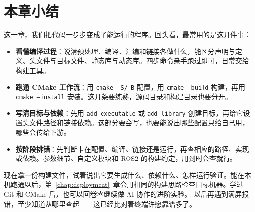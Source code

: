 \documentclass[
  lang=cn,
  scheme=chinese,
  chinesefont=ctexfont,
  11pt,
  oneside,
  device=normal,
  color=cyan,
  mode=fancy
]{../templates/elegantbook}
\begin{document}
\begingroup
\setlength{\emergencystretch}{3em}
\let\subsection\section

\makeatletter
\let\subsection\textbook@subsection
\makeatother

\clearpage
\section{本章小结}
这一章，我们把代码一步步变成了能运行的程序。回头看，最常用的是这几件事：
\begin{itemize}
    \item \textbf{看懂编译过程}：说清预处理、编译、汇编和链接各做什么，能区分声明与定义、头文件与目标文件、静态库与动态库。四步命令亲手跑过即可，日常交给构建工具。
    \item \textbf{跑通 CMake 工作流}：用 \texttt{cmake -S/-B} 配置，用 \texttt{cmake --build} 构建，再用 \texttt{cmake --install} 安装。这几条要练熟，源码目录和构建目录也要分开。
    \item \textbf{写清目标与依赖}：先用 \texttt{add\_executable} 或 \texttt{add\_library} 创建目标，再给它设置头文件路径和链接依赖。这部分要会写，也要能说出哪些配置只给自己用，哪些会传给下游。
    \item \textbf{按阶段排错}：先判断卡在配置、编译、链接还是运行，再查相应的路径、实现或依赖。参数细节、自定义模块和 ROS2 的构建约定，用到时会查就行。
\end{itemize}
现在拿一份构建文件，试着说出它要生成什么、依赖什么、怎样运行验证。能在本机跑通以后，第~\ref{chap:deployment}~章会用相同的构建思路检查目标机器。学过 Git 和 CMake 后，也可以回卷零继续做 AI 协作的进阶实验。
以后再遇到满屏报错，至少知道从哪里查起——这已经比对着终端许愿靠谱多了。
\end{document}
